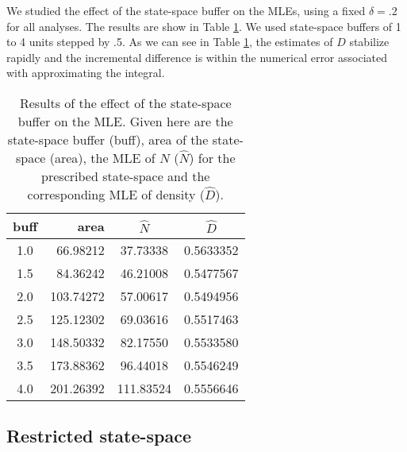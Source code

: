 We studied the effect of the state-space buffer on the MLEs,
using a fixed $\delta = .2$ for all analyses. The results are show in Table \ref{mle.tab.buff}. 
We used state-space buffers
of 1 to 4 units stepped by .5. As we can see in Table \ref{mle.tab.buff}, 
the estimates of $D$ stabilize rapidly and the incremental difference
is within the numerical error associated with approximating the
integral.  

\begin{table}[ht]
\centering
\caption{Results of the effect of the state-space buffer on the MLE. 
Given here are the state-space buffer (buff), area of the state-space (area), the
MLE of $N$ ($\hat{N}$) for the prescribed state-space and the corresponding MLE of
density ($\hat{D}$).}
\begin{tabular}{crcc}
\hline \hline
buff    & area & $\hat{N}$ & $\hat{D}$ \\ \hline
 1.0 & 66.98212 & 37.73338 & 0.5633352  \\
 1.5 & 84.36242 & 46.21008 & 0.5477567  \\
 2.0 &103.74272 & 57.00617 & 0.5494956  \\
 2.5 &125.12302 & 69.03616 & 0.5517463  \\
 3.0 &148.50332 & 82.17550 & 0.5533580  \\ 
 3.5 &173.88362 & 96.44018 & 0.5546249  \\
 4.0 &201.26392 &111.83524 & 0.5556646  \\  \hline
\end{tabular}
\label{mle.tab.buff}
\end{table}


\subsection{Restricted state-space}
\label{mle.sec.shapefile}

